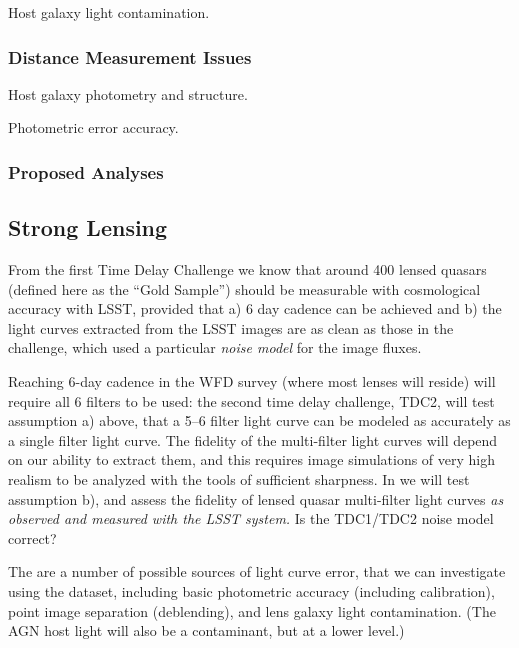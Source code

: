 Host galaxy light contamination.



\subsubsection{Distance Measurement Issues}
\label{sec:twinkles1:science:supernovae:distance}

Host galaxy photometry and structure.

Photometric error accuracy.


\subsubsection{Proposed Analyses}
\label{sec:twinkles1:science:supernovae:analyses}



\subsection{Strong Lensing}
\label{sec:twinkles1:science:stronglensing}

From the first Time Delay Challenge we know that around 400 lensed
quasars (defined here as the ``Gold Sample'') should be measurable
with cosmological accuracy with LSST, provided that a) 6 day cadence
can be achieved and b) the light curves extracted from the LSST images
are as clean as those in the challenge, which used a particular {\it noise
model} for the image fluxes.

Reaching 6-day cadence  in the WFD survey (where most lenses will
reside) will require all 6 filters to be used: the second time delay
challenge, TDC2, will test assumption a) above, that  a 5--6 filter
light curve can be modeled as accurately as a single filter light
curve. The fidelity of the multi-filter light curves will depend on
our ability to extract them, and this requires image simulations of
very high realism to be analyzed with the tools of sufficient
sharpness. In \TwinklesOne we will test assumption b), and assess the
fidelity of lensed quasar multi-filter light curves {\it as observed and
measured with the LSST system.} Is the TDC1/TDC2 noise model correct?

The are a number of possible sources of light curve error, that we can
investigate using the \TwinklesOne dataset, including basic photometric
accuracy (including calibration), point image separation (deblending), and
lens galaxy light contamination. (The AGN host light will also be a contaminant,
but at a lower level.)

